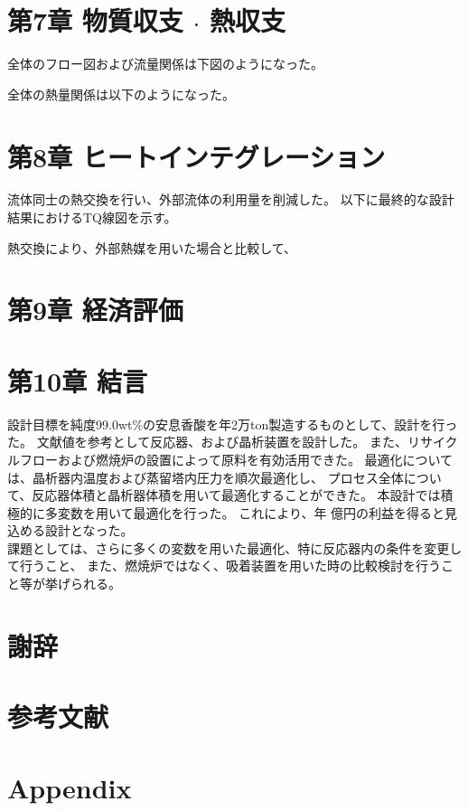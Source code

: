 \documentclass[a4j]{jsarticle}
\begin{document}
\newpage
\section*{第7章 物質収支 $\cdot$ 熱収支}
全体のフロー図および流量関係は下図のようになった。

全体の熱量関係は以下のようになった。

\newpage
\section*{第8章 ヒートインテグレーション}
流体同士の熱交換を行い、外部流体の利用量を削減した。
以下に最終的な設計結果におけるTQ線図を示す。

熱交換により、外部熱媒を用いた場合と比較して、

\newpage
\section*{第9章 経済評価}

\newpage
\section*{第10章 結言}
設計目標を純度99.0wt\%の安息香酸を年2万ton製造するものとして、設計を行った。
文献値を参考として反応器、および晶析装置を設計した。
また、リサイクルフローおよび燃焼炉の設置によって原料を有効活用できた。
最適化については、晶析器内温度および蒸留塔内圧力を順次最適化し、
プロセス全体について、反応器体積と晶析器体積を用いて最適化することができた。
本設計では積極的に多変数を用いて最適化を行った。
これにより、年 億円の利益を得ると見込める設計となった。\\
課題としては、さらに多くの変数を用いた最適化、特に反応器内の条件を変更して行うこと、
また、燃焼炉ではなく、吸着装置を用いた時の比較検討を行うこと等が挙げられる。

\newpage
\section*{謝辞}

\newpage
\section*{参考文献}

\newpage
\section*{Appendix}
\end{document}
